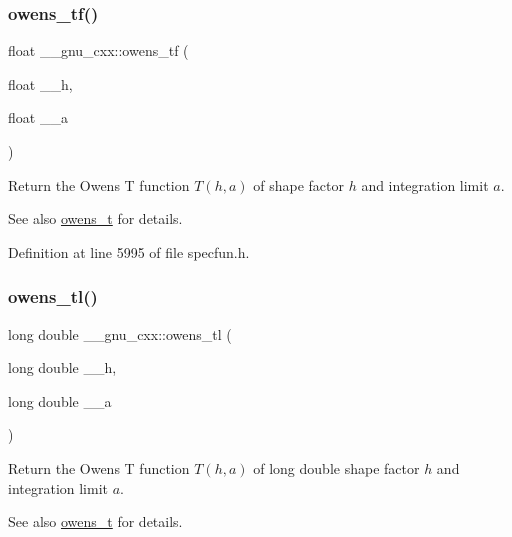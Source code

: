 \subsubsection{\texorpdfstring{owens\+\_\+tf()}{owens\_tf()}}
{\footnotesize\ttfamily float \+\_\+\+\_\+gnu\+\_\+cxx\+::owens\+\_\+tf (\begin{DoxyParamCaption}\item[{float}]{\+\_\+\+\_\+h,  }\item[{float}]{\+\_\+\+\_\+a }\end{DoxyParamCaption})\hspace{0.3cm}{\ttfamily [inline]}}

Return the Owens T function $ T(h,a) $ of shape factor $ h $ and integration limit $ a $.

\begin{DoxySeeAlso}{See also}
\hyperlink{group__gnu__math__spec__func_gab4e367aae19853cca3af99eead01fcaa}{owens\+\_\+t} for details. 
\end{DoxySeeAlso}


Definition at line 5995 of file specfun.\+h.

\mbox{\label{group__gnu__math__spec__func_ga7a8bc60dc0ef4a009586872eb7cac2d0}} 
\subsubsection{\texorpdfstring{owens\+\_\+tl()}{owens\_tl()}}
{\footnotesize\ttfamily long double \+\_\+\+\_\+gnu\+\_\+cxx\+::owens\+\_\+tl (\begin{DoxyParamCaption}\item[{long double}]{\+\_\+\+\_\+h,  }\item[{long double}]{\+\_\+\+\_\+a }\end{DoxyParamCaption})\hspace{0.3cm}{\ttfamily [inline]}}

Return the Owens T function $ T(h,a) $ of {\ttfamily long double} shape factor $ h $ and integration limit $ a $.

\begin{DoxySeeAlso}{See also}
\hyperlink{group__gnu__math__spec__func_gab4e367aae19853cca3af99eead01fcaa}{owens\+\_\+t} for details. 
\end{DoxySeeAlso}


